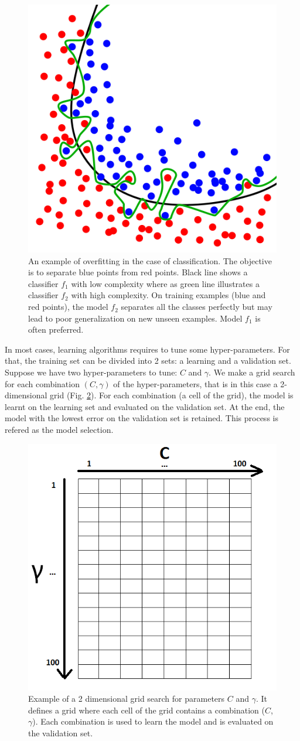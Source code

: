 \begin{figure}[h!]
	\centering
	\includegraphics[width=0.4\linewidth]{images/Overfitting}
	\caption{An example of overfitting in the case of classification. The objective is to separate blue points from red points. Black line shows a classifier $f_1$ with low complexity where as green line illustrates a classifier $f_2$ with high complexity. On training examples (blue and red points), the model $f_2$ separates all the classes perfectly but may lead to poor generalization on new unseen examples. Model $f_1$ is often preferred.}
	\label{fig:Overfitting}
\end{figure}

In most cases, learning algorithms requires to tune some hyper-parameters. For that, the training set can be divided into 2 sets: a learning and a validation set. Suppose we have two hyper-parameters to tune: $C$ and $\gamma$. We make a grid search for each combination $(C,\gamma)$ of the hyper-parameters, that is in this case a 2-dimensional grid (Fig. \ref{fig:GridSearch}). For each combination (a cell of the grid), the model is learnt on the learning set and evaluated on the validation set. At the end, the model with the lowest error on the validation set is retained. This process is refered as the model selection. 

\begin{figure}[h!]
	\centering
	\includegraphics[width=0.35\linewidth]{images/GridSearch}
	\caption{Example of a 2 dimensional grid search for parameters $C$ and $\gamma$. It defines a grid where each cell of the grid contains a combination ($C$, $\gamma$). Each combination is used to learn the model and is evaluated on the validation set.}
	\label{fig:GridSearch}
\end{figure}

